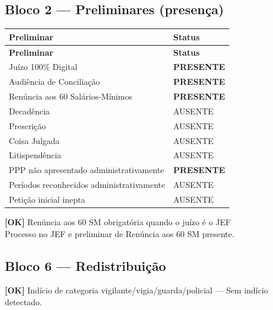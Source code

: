 \documentclass[12pt,a4paper]{article}
\newcommand{\statusOK}[1]{\textcolor{corOK}{\textbf{[OK]}} #1}
\begin{document}
\subsection{Bloco 2 --- Preliminares (presença)}

\begin{longtable}{p{8.5cm} p{4.5cm}}
  \toprule
  \textbf{Preliminar} & \textbf{Status} \\
  \midrule
  \endfirsthead
  \toprule
  \textbf{Preliminar} & \textbf{Status} \\
  \midrule
  \endhead
  Juízo 100\% Digital                           & \textcolor{corOK}{\textbf{PRESENTE}} \\
  Audiência de Conciliação                      & \textcolor{corOK}{\textbf{PRESENTE}} \\
  Renúncia aos 60 Salários-Mínimos              & \textcolor{corOK}{\textbf{PRESENTE}} \\
  Decadência                                    & AUSENTE \\
  Prescrição                                    & AUSENTE \\
  Coisa Julgada                                 & AUSENTE \\
  Litispendência                                & AUSENTE \\
  PPP não apresentado administrativamente       & \textcolor{corOK}{\textbf{PRESENTE}} \\
  Períodos reconhecidos administrativamente     & AUSENTE \\
  Petição inicial inepta                        & AUSENTE \\
  \bottomrule
\end{longtable}

\statusOK{Renúncia aos 60 SM obrigatória quando o juízo é o JEF}\\
Processo no JEF e preliminar de Renúncia aos 60 SM presente.

\subsection{Bloco 6 --- Redistribuição}

\statusOK{Indício de categoria vigilante/vigia/guarda/policial} --- Sem indício detectado.
\end{document}
